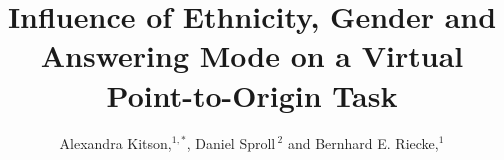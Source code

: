 \documentclass{frontiersSCNS} %
\def\firstAuthorLast{Kitson {et~al.}} %
\def\Authors{Alexandra Kitson,$^{1,*}$, Daniel Sproll\,$^{2}$ and Bernhard E. Riecke,$^1$}
\begin{document}
\onecolumn
{}

\title[Individual Factors in Path Integration]{Influence of Ethnicity, Gender and Answering Mode on a Virtual Point-to-Origin Task}
\author[\firstAuthorLast ]{\Authors}
\address{}
\correspondance{}
\extraAuth{}%
\topic{}%

\maketitle

\end{document}

